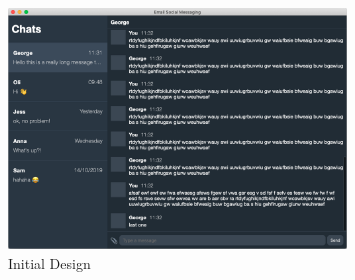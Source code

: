 \begin{figure}[h!]
  \centering
  \includegraphics[width=0.8\textwidth]{images/implementation-main.png}
  \caption{Initial Design}
  \label{fig:login-ui}
\end{figure}